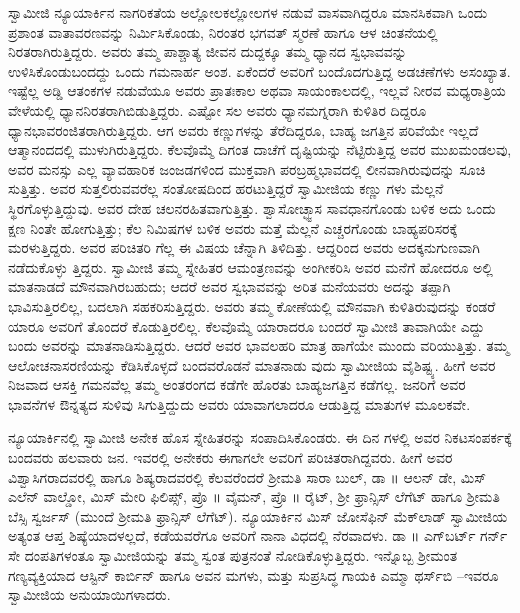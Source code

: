 ಸ್ವಾಮೀಜಿ ನ್ಯೂಯಾರ್ಕಿನ ನಾಗರಿಕತೆಯ ಅಲ್ಲೋಲಕಲ್ಲೋಲಗಳ ನಡುವೆ ವಾಸವಾಗಿದ್ದರೂ ಮಾನಸಿಕವಾಗಿ ಒಂದು ಪ್ರಶಾಂತ ವಾತಾವರಣವನ್ನು ನಿರ್ಮಿಸಿಕೊಂಡು, ನಿರಂತರ ಭಗವತ್ ಸ್ಮರಣೆ ಹಾಗೂ ಆಳ ಚಿಂತನೆಯಲ್ಲಿ ನಿರತರಾಗಿರುತ್ತಿದ್ದರು. ಅವರು ತಮ್ಮ ಪಾಶ್ಚಾತ್ಯ ಜೀವನ ದುದ್ದಕ್ಕೂ ತಮ್ಮ ಧ್ಯಾನದ ಸ್ವಭಾವವನ್ನು ಉಳಿಸಿಕೊಂಡುಬಂದದ್ದು ಒಂದು ಗಮನಾರ್ಹ ಅಂಶ. ಏಕೆಂದರೆ ಅವರಿಗೆ ಬಂದೊದಗುತ್ತಿದ್ದ ಅಡಚಣೆಗಳು ಅಸಂಖ್ಯಾತ. ಇಷ್ಟೆಲ್ಲ ಅಡ್ಡಿ ಆತಂಕಗಳ ನಡುವೆಯೂ ಅವರು ಪ್ರಾತಃಕಾಲ ಅಥವಾ ಸಾಯಂಕಾಲದಲ್ಲಿ, ಇಲ್ಲವೆ ನೀರವ ಮಧ್ಯರಾತ್ರಿಯ ವೇಳೆಯಲ್ಲಿ ಧ್ಯಾನನಿರತರಾಗಿಬಿಡುತ್ತಿದ್ದರು. ಎಷ್ಟೋ ಸಲ ಅವರು ಧ್ಯಾನಮಗ್ನರಾಗಿ ಕುಳಿತಿರ ದಿದ್ದರೂ ಧ್ಯಾನಭಾವರಂಜಿತರಾಗಿರುತ್ತಿದ್ದರು. ಆಗ ಅವರು ಕಣ್ಣುಗಳನ್ನು ತೆರೆದಿದ್ದರೂ, ಬಾಹ್ಯ ಜಗತ್ತಿನ ಪರಿವೆಯೇ ಇಲ್ಲದೆ ಆತ್ಮಾನಂದದಲ್ಲಿ ಮುಳುಗಿರುತ್ತಿದ್ದರು. ಕೆಲವೊಮ್ಮೆ ದಿಗಂತ ದಾಚೆಗೆ ದೃಷ್ಟಿಯನ್ನು ನೆಟ್ಟಿರುತ್ತಿದ್ದ ಅವರ ಮುಖಮಂಡಲವು, ಅವರ ಮನಸ್ಸು ಎಲ್ಲ ವ್ಯಾವಹಾರಿಕ ಜಂಜಡಗಳಿಂದ ಮುಕ್ತವಾಗಿ ಪರಬ್ರಹ್ಮಭಾವದಲ್ಲಿ ಲೀನವಾಗಿರುವುದನ್ನು ಸೂಚಿ ಸುತ್ತಿತ್ತು. ಅವರ ಸುತ್ತಲಿರುವವರೆಲ್ಲ ಸಂತೋಷದಿಂದ ಹರಟುತ್ತಿದ್ದರೆ ಸ್ವಾಮೀಜಿಯ ಕಣ್ಣು ಗಳು ಮೆಲ್ಲನೆ ಸ್ಥಿರಗೊಳ್ಳುತ್ತಿದ್ದುವು. ಅವರ ದೇಹ ಚಲನರಹಿತವಾಗುತ್ತಿತ್ತು. ಶ್ವಾಸೋಚ್ಛ್ವಾಸ ಸಾವಧಾನಗೊಂಡು ಬಳಿಕ ಅದು ಒಂದು ಕ್ಷಣ ನಿಂತೇ ಹೋಗುತ್ತಿತ್ತು; ಕೆಲ ನಿಮಿಷಗಳ ಬಳಿಕ ಅವರು ಮತ್ತೆ ಮೆಲ್ಲನೆ ಎಚ್ಚರಗೊಂಡು ಬಾಹ್ಯಪರಿಸರಕ್ಕೆ ಮರಳುತ್ತಿದ್ದರು. ಅವರ ಪರಿಚಿತರಿ ಗೆಲ್ಲ ಈ ವಿಷಯ ಚೆನ್ನಾಗಿ ತಿಳಿದಿತ್ತು. ಆದ್ದರಿಂದ ಅವರು ಅದಕ್ಕನುಗುಣವಾಗಿ ನಡೆದುಕೊಳ್ಳು ತ್ತಿದ್ದರು. ಸ್ವಾಮೀಜಿ ತಮ್ಮ ಸ್ನೇಹಿತರ ಆಮಂತ್ರಣವನ್ನು ಅಂಗೀಕರಿಸಿ ಅವರ ಮನೆಗೆ ಹೋದರೂ ಅಲ್ಲಿ ಮಾತನಾಡದೆ ಮೌನವಾಗಿರಬಹುದು; ಆದರೆ ಅವರ ಸ್ವಭಾವವನ್ನು ಅರಿತ ಮನೆಯವರು ಅದನ್ನು ತಪ್ಪಾಗಿ ಭಾವಿಸುತ್ತಿರಲಿಲ್ಲ, ಬದಲಾಗಿ ಸಹಕರಿಸುತ್ತಿದ್ದರು. ಅವರು ತಮ್ಮ ಕೋಣೆಯಲ್ಲಿ ಮೌನವಾಗಿ ಕುಳಿತಿರುವುದನ್ನು ಕಂಡರೆ ಯಾರೂ ಅವರಿಗೆ ತೊಂದರೆ ಕೊಡುತ್ತಿರಲಿಲ್ಲ. ಕೆಲವೊಮ್ಮೆ ಯಾರಾದರೂ ಬಂದರೆ ಸ್ವಾಮೀಜಿ ತಾವಾಗಿಯೇ ಎದ್ದು ಬಂದು ಅವರನ್ನು ಮಾತನಾಡಿಸುತ್ತಿದ್ದರು. ಆದರೆ ಅವರ ಭಾವಲಹರಿ ಮಾತ್ರ ಹಾಗೆಯೇ ಮುಂದು ವರಿಯುತ್ತಿತ್ತು. ತಮ್ಮ ಆಲೋಚನಾಸರಣಿಯನ್ನು ಕೆಡಿಸಿಕೊಳ್ಳದೆ ಬಂದವರೊಡನೆ ಮಾತನಾಡು ವುದು ಸ್ವಾಮೀಜಿಯ ವೈಶಿಷ್ಟ್ಯ. ಹೀಗೆ ಅವರ ನಿಜವಾದ ಆಸಕ್ತಿ ಗಮನವೆಲ್ಲ ತಮ್ಮ ಅಂತರಂಗದ ಕಡೆಗೇ ಹೊರತು ಬಾಹ್ಯಜಗತ್ತಿನ ಕಡೆಗಲ್ಲ. ಜನರಿಗೆ ಅವರ ಭಾವನೆಗಳ ಔನ್ನತ್ಯದ ಸುಳಿವು ಸಿಗುತ್ತಿದ್ದುದು ಅವರು ಯಾವಾಗಲಾದರೂ ಆಡುತ್ತಿದ್ದ ಮಾತುಗಳ ಮೂಲಕವೇ.

ನ್ಯೂಯಾರ್ಕಿನಲ್ಲಿ ಸ್ವಾಮೀಜಿ ಅನೇಕ ಹೊಸ ಸ್ನೇಹಿತರನ್ನು ಸಂಪಾದಿಸಿಕೊಂಡರು. ಈ ದಿನ ಗಳಲ್ಲಿ ಅವರ ನಿಕಟಸಂಪರ್ಕಕ್ಕೆ ಬಂದವರು ಹಲವಾರು ಜನ. ಇವರಲ್ಲಿ ಅನೇಕರು ಈಗಾಗಲೇ ಅವರಿಗೆ ಪರಿಚಿತರಾಗಿದ್ದವರು. ಹೀಗೆ ಅವರ ವಿಶ್ವಾಸಿಗರಾದವರಲ್ಲಿ ಹಾಗೂ ಶಿಷ್ಯರಾದವರಲ್ಲಿ ಕೆಲವರೆಂದರೆ ಶ್ರೀಮತಿ ಸಾರಾ ಬುಲ್, ಡಾ ॥ ಆಲನ್ ಡೇ, ಮಿಸ್ ಎಲೆನ್ ವಾಲ್ಡೋ, ಮಿಸ್ ಮೇರಿ ಫಿಲಿಪ್ಸ್, ಪ್ರೊ ॥ ವೈಮನ್, ಪ್ರೊ ॥ ರೈಟ್, ಶ್ರೀ ಫ್ರಾನ್ಸಿಸ್ ಲೆಗೆಟ್ ಹಾಗೂ ಶ್ರೀಮತಿ ಬೆಸ್ಸಿ ಸ್ವರ್ಜಸ್ (ಮುಂದೆ ಶ್ರೀಮತಿ ಫ್ರಾನ್ಸಿಸ್ ಲೆಗೆಟ್​). ನ್ಯೂಯಾರ್ಕಿನ ಮಿಸ್ ಜೋಸೆಫಿನ್ ಮೆಕ್​ಲಾಡ್ ಸ್ವಾಮೀಜಿಯ ಅತ್ಯಂತ ಆಪ್ತ ಶಿಷ್ಯೆಯಾದಳಲ್ಲದೆ, ಕಡೆಯವರೆಗೂ ಅವರಿಗೆ ನಾನಾ ವಿಧದಲ್ಲಿ ನೆರವಾದಳು. ಡಾ ॥ ಎಗ್​ಬರ್ಟ್ ಗರ್ನ್​ಸೇ ದಂಪತಿಗಳಂತೂ ಸ್ವಾಮೀಜಿಯನ್ನು ತಮ್ಮ ಸ್ವಂತ ಪುತ್ರನಂತೆ ನೋಡಿಕೊಳ್ಳುತ್ತಿದ್ದರು. ಇನ್ನೊಬ್ಬ ಶ್ರೀಮಂತ ಗಣ್ಯವ್ಯಕ್ತಿಯಾದ ಆಸ್ಟಿನ್ ಕಾರ್ಬಿನ್ ಹಾಗೂ ಅವನ ಮಗಳು, ಮತ್ತು ಸುಪ್ರಸಿದ್ಧ ಗಾಯಕಿ ಎಮ್ಮಾ ಥರ್ಸ್​ಬಿ –ಇವರೂ ಸ್ವಾಮೀಜಿಯ ಅನುಯಾಯಿಗಳಾದರು.

